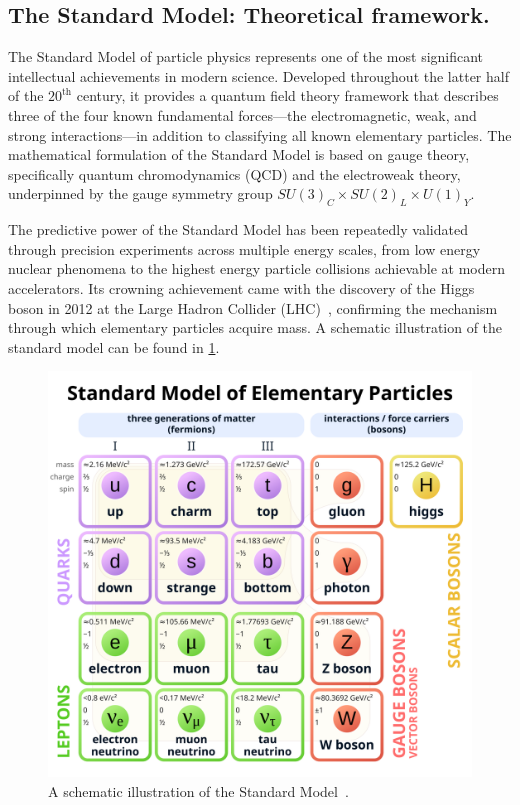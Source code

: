 \begin{definition}
\section{The Standard Model: Theoretical framework.}
The Standard Model of particle physics represents one of the most significant intellectual achievements in modern science.
%
Developed throughout the latter half of the $20^{\text{th}}$ century, it provides a quantum field theory framework that describes three of the four known fundamental forces—the electromagnetic, weak, and strong interactions---in addition to classifying all known elementary particles.
%
The mathematical formulation of the Standard Model is based on gauge theory, specifically quantum chromodynamics (QCD) and the electroweak theory, underpinned by the gauge symmetry group \(SU(3)_C\times SU(2)_L\times U(1)_Y\).

The predictive power of the Standard Model has been repeatedly validated through precision experiments across multiple energy scales, from low energy nuclear phenomena to the highest energy particle collisions achievable at modern accelerators.
%
Its crowning achievement came with the discovery of the Higgs boson in 2012 at the Large Hadron Collider (LHC)~\cite{ATLAS:2012yve, collaboration_observation_2012}, confirming the mechanism through which elementary particles acquire mass.
%
A schematic illustration of the standard model can be found in \cref{fig:sm}.

\begin{figure}
    \centering
    \includegraphics[width=0.75\linewidth]{figures/chapter-01/Standard_Model_of_Elementary_Particles.svg.png}
    \caption{
        A schematic illustration of the Standard Model~\cite{wiki:stdmodel}.
    }
    \label{fig:sm}
\end{figure}

\end{definition}
